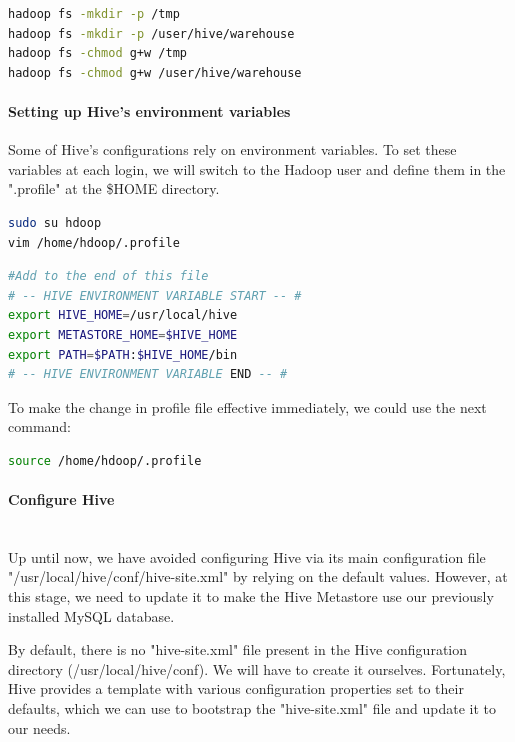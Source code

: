 \documentclass[12pt,english]{book}
\begin{document}
\begin{lstlisting}[language=bash, frame=single, basicstyle=\footnotesize]
hadoop fs -mkdir -p /tmp
hadoop fs -mkdir -p /user/hive/warehouse
hadoop fs -chmod g+w /tmp
hadoop fs -chmod g+w /user/hive/warehouse
\end{lstlisting}

\paragraph{Setting up Hive's environment variables}

Some of Hive's configurations rely on environment variables.
To set these variables at each login, we will switch to the Hadoop user and define them in the ".profile" at the \$HOME directory.

\begin{lstlisting}[language=bash, frame=single, basicstyle=\footnotesize]
sudo su hdoop
vim /home/hdoop/.profile
\end{lstlisting}

\begin{lstlisting}[language=bash, frame=single, basicstyle=\footnotesize]
#Add to the end of this file 
# -- HIVE ENVIRONMENT VARIABLE START -- #
export HIVE_HOME=/usr/local/hive
export METASTORE_HOME=$HIVE_HOME
export PATH=$PATH:$HIVE_HOME/bin
# -- HIVE ENVIRONMENT VARIABLE END -- #
\end{lstlisting}

To make the change in profile file effective immediately, we could use the next command:

\begin{lstlisting}[language=bash, frame=single, basicstyle=\footnotesize]
source /home/hdoop/.profile
\end{lstlisting}

\paragraph{Configure Hive}\mbox{}\\

Up until now, we have avoided configuring Hive via its main configuration file "/usr/local/hive/conf/hive-site.xml" by relying on the default values.
However, at this stage, we need to update it to make the Hive Metastore use our previously installed MySQL database.

By default, there is no "hive-site.xml" file present in the Hive configuration directory (/usr/local/hive/conf).
We will have to create it ourselves.
Fortunately, Hive provides a template with various configuration properties set to their defaults, which we can use to bootstrap the "hive-site.xml" file and update it to our needs.
\end{document}
